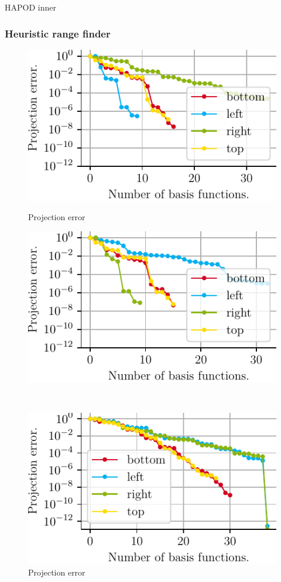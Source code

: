 \documentclass[a4paper]{eccomas_paper-2024}
\begin{document}
\begin{table}
    \centering
    \caption{HAPOD inner}\label{tab:hapod_inner}
    
\end{table}

\subsubsection{Heuristic range finder}

\begin{figure}[!htb]
  \includegraphics{./figures/beam/fig_proj_error_left_heuristic.pdf}
  \caption{Projection error }\label{fig:proj_error_left_heuristic}
\endminipage\hfill
{}
  \includegraphics{./figures/beam/fig_proj_error_right_heuristic.pdf}
  \caption{Projection error }\label{fig:proj_error_right_heuristic}
\endminipage\hfill\\
\begin{center}
%
  \includegraphics{./figures/beam/fig_proj_error_inner_heuristic.pdf}

\end{center}
\end{figure}
\end{document}
